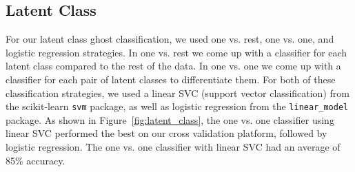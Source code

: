 \documentclass[11pt]{amsart}
\begin{document}

\subsection{Latent Class}

For our latent class ghost classification, we used one vs. rest, one vs. one, and logistic regression strategies. In one vs. rest we come up with a classifier for each latent class compared to the rest of the data. In one vs. one we come up with a classifier for each pair of latent classes to differentiate them. For both of these classification strategies, we used a linear SVC (support vector classification) from the scikit-learn \texttt{svm} package, as well as logistic regression from the \texttt{linear\_model} package. As shown in Figure~\ref{fig:latent_class}, the one vs. one classifier using linear SVC performed the best on our cross validation platform, followed by logistic regression. The one vs. one classifier with linear SVC had an average of 85\% accuracy.
\end{document}
